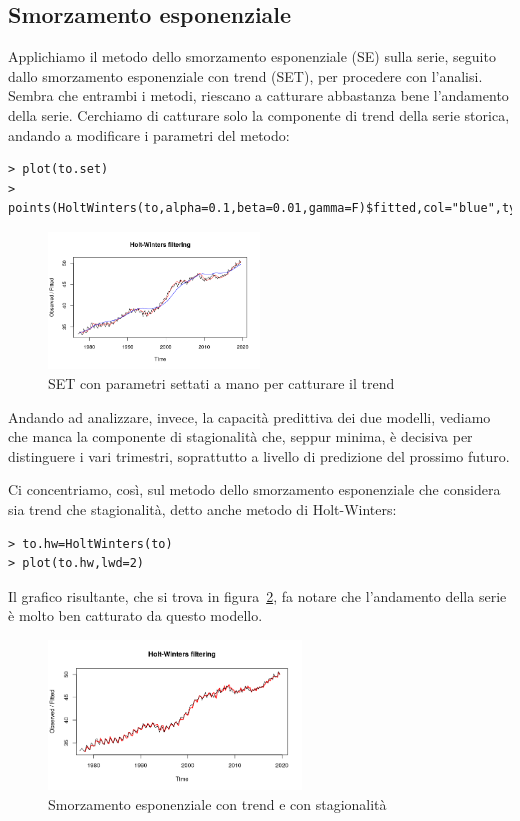 \documentclass[11pt,a4paper,oneside]{article}
\begin{document}
\subsection{Smorzamento esponenziale}
Applichiamo il metodo dello smorzamento esponenziale (SE) sulla serie, seguito dallo smorzamento esponenziale con trend (SET), per procedere con l'analisi.
Sembra che entrambi i metodi, riescano a catturare abbastanza bene l'andamento della serie.
Cerchiamo di catturare solo la componente di trend della serie storica, andando a modificare i parametri del metodo:
\begin{verbatim}
> plot(to.set)
> points(HoltWinters(to,alpha=0.1,beta=0.01,gamma=F)$fitted,col="blue",type="l")
\end{verbatim}
\begin{figure}[h]
\centering
\includegraphics[width=0.5\textwidth]{images/trend}
\caption{SET con parametri settati a mano per catturare il trend}
\label{fig:trend}
\end{figure}

Andando ad analizzare, invece, la capacità predittiva dei due modelli, vediamo che manca la componente di stagionalità che, seppur minima, è decisiva per distinguere i vari trimestri, soprattutto a livello di predizione del prossimo futuro.

Ci concentriamo, così, sul metodo dello smorzamento esponenziale che considera sia trend che stagionalità, detto anche metodo di Holt-Winters:
\begin{verbatim}
> to.hw=HoltWinters(to)
> plot(to.hw,lwd=2)
\end{verbatim}
Il grafico risultante, che si trova in figura~\ref{fig:hw}, fa notare che l'andamento della serie è molto ben catturato da questo modello. 
\begin{figure}[h]
\centering
\includegraphics[width=0.6\textwidth]{images/hw}
\caption{Smorzamento esponenziale con trend e con stagionalità}
\label{fig:hw}
\end{figure}
\end{document}
